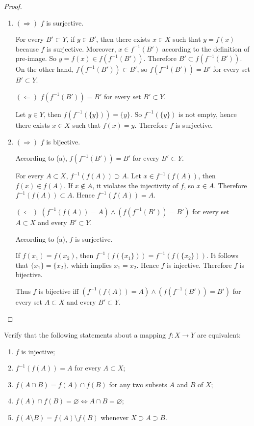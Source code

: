 \begin{proof}
    \begin{enumerate}[label={(\alph*)}]
        \item $(\Rightarrow)$ $f$ is surjective.

              For every $B'\subset Y$, if $y\in B'$, then there exists $x\in X$ such that $y = f(x)$ because $f$ is surjective. Moreover, $x\in f^{-1}(B')$ according to the definition of pre-image. So $y = f(x)\in f(f^{-1}(B'))$. Therefore $B'\subset f(f^{-1}(B'))$. On the other hand, $f(f^{-1}(B'))\subset B'$, so $f(f^{-1}(B')) = B'$ for every set $B'\subset Y$.

              $(\Leftarrow)$ $f(f^{-1}(B')) = B'$ for every set $B'\subset Y$.

              Let $y\in Y$, then $f(f^{-1}(\{y\})) = \{y\}$. So $f^{-1}(\{y\})$ is not empty, hence there exists $x\in X$ such that $f(x) = y$. Therefore $f$ is surjective.
        \item $(\Rightarrow)$ $f$ is bijective.

              According to (a), $f(f^{-1}(B')) = B'$ for every $B'\subset Y$.

              For every $A\subset X$, $f^{-1}(f(A))\supset A$. Let $x\in f^{-1}(f(A))$, then $f(x)\in f(A)$. If $x\notin A$, it violates the injectivity of $f$, so $x\in A$. Therefore $f^{-1}(f(A))\subset A$. Hence $f^{-1}(f(A)) = A$.

              $(\Leftarrow)$ $\left(f^{-1}(f(A)) = A\right) \land \left( f(f^{-1}(B')) = B' \right)$ for every set $A\subset X$ and every $B'\subset Y$.

              According to (a), $f$ is surjective.

              If $f(x_{1}) = f(x_{2})$, then $f^{-1}(f(\{x_{1}\})) = f^{-1}(f(\{x_{2}\}))$. It follows that $\{ x_{1} \} = \{ x_{2} \}$, which implies $x_{1} = x_{2}$. Hence $f$ is injective. Therefore $f$ is bijective.

              \bigskip

              Thus $f$ is bijective iff $\left(f^{-1}(f(A)) = A\right) \land \left( f(f^{-1}(B')) = B' \right)$ for every set $A\subset X$ and every $B'\subset Y$.
    \end{enumerate}
\end{proof}
\newpage

\begin{exercise}
    Verify that the following statements about a mapping $f: X \to Y$ are equivalent:
    \begin{enumerate}[label={(\alph*)}]
        \item $f$ is injective;
        \item $f^{-1}(f(A)) = A$ for every $A\subset X$;
        \item $f(A\cap B) = f(A)\cap f(B)$ for any two subsets $A$ and $B$ of $X$;
        \item $f(A)\cap f(B) = \varnothing \Leftrightarrow A\cap B = \varnothing$;
        \item $f(A\setminus B) = f(A)\setminus f(B)$ whenever $X\supset A\supset B$.
    \end{enumerate}
\end{exercise}

